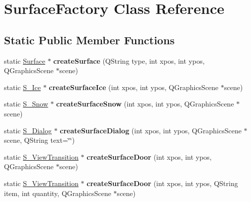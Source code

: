 \hypertarget{class_surface_factory}{}\section{Surface\+Factory Class Reference}
\label{class_surface_factory}
\subsection*{Static Public Member Functions}
\begin{DoxyCompactItemize}
\item 
\hypertarget{class_surface_factory_ab18ff8451ef0e58ccfd9f9adf500f152}{}static \hyperlink{class_surface}{Surface} $\ast$ {\bfseries create\+Surface} (Q\+String type, int xpos, int ypos, Q\+Graphics\+Scene $\ast$scene)\label{class_surface_factory_ab18ff8451ef0e58ccfd9f9adf500f152}

\item 
\hypertarget{class_surface_factory_a5a6995214a32599e1e4976aa21857661}{}static \hyperlink{class_s___ice}{S\+\_\+\+Ice} $\ast$ {\bfseries create\+Surface\+Ice} (int xpos, int ypos, Q\+Graphics\+Scene $\ast$scene)\label{class_surface_factory_a5a6995214a32599e1e4976aa21857661}

\item 
\hypertarget{class_surface_factory_a5b80d91edb76641c63c1395b2751b993}{}static \hyperlink{class_s___snow}{S\+\_\+\+Snow} $\ast$ {\bfseries create\+Surface\+Snow} (int xpos, int ypos, Q\+Graphics\+Scene $\ast$scene)\label{class_surface_factory_a5b80d91edb76641c63c1395b2751b993}

\item 
\hypertarget{class_surface_factory_adb8b09365d4f56cc702aeaec7bb0786f}{}static \hyperlink{class_s___dialog}{S\+\_\+\+Dialog} $\ast$ {\bfseries create\+Surface\+Dialog} (int xpos, int ypos, Q\+Graphics\+Scene $\ast$scene, Q\+String text=\char`\"{}\char`\"{})\label{class_surface_factory_adb8b09365d4f56cc702aeaec7bb0786f}

\item 
\hypertarget{class_surface_factory_a3df927232f4b05615c614059b30d6c70}{}static \hyperlink{class_s___view_transition}{S\+\_\+\+View\+Transition} $\ast$ {\bfseries create\+Surface\+Door} (int xpos, int ypos, Q\+Graphics\+Scene $\ast$scene)\label{class_surface_factory_a3df927232f4b05615c614059b30d6c70}

\item 
\hypertarget{class_surface_factory_a2efc6a8f56b1be1c4ce6a785106fb92b}{}static \hyperlink{class_s___view_transition}{S\+\_\+\+View\+Transition} $\ast$ {\bfseries create\+Surface\+Door} (int xpos, int ypos, Q\+String item, int quantity, Q\+Graphics\+Scene $\ast$scene)\label{class_surface_factory_a2efc6a8f56b1be1c4ce6a785106fb92b}


\end{DoxyCompactItemize}
